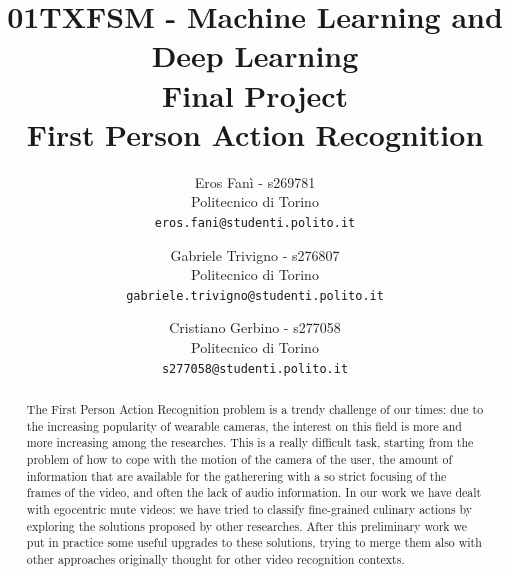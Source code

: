 \documentclass[10pt,twocolumn,hidelinks,letterpaper]{article}
\begin{document}
\title{01TXFSM - Machine Learning and Deep Learning \\
\vspace{0.3in}
Final Project \\
First Person Action Recognition}

\author{
  Eros Fanì - s269781\\
  Politecnico di Torino\\
  {\tt\small eros.fani@studenti.polito.it}
  \and
  Gabriele Trivigno - s276807\\
  Politecnico di Torino\\
  {\tt\small gabriele.trivigno@studenti.polito.it}
  \and
  Cristiano Gerbino - s277058\\
  Politecnico di Torino\\
  {\tt\small s277058@studenti.polito.it}
}

\maketitle


\newcommand{\quotes}[1]{“#1”}
\newcommand{\reff}[1]{Figure \ref{#1}}
\setlength{\parindent}{0pt}
\setlength{\parskip}{1em}

\begin{abstract}

The First Person Action Recognition problem is a trendy challenge of our times: due to the increasing popularity of wearable cameras, the interest on this field is more and more increasing among the researches. This is a really difficult task, starting from the problem of how to cope with the motion of the camera of the user, the amount of information that are available for the gatherering with a so strict focusing of the frames of the video, and often the lack of audio information. In our work we have dealt with egocentric mute videos: we have tried to classify fine-grained culinary actions by exploring the solutions proposed by other researches. After this preliminary work we put in practice some useful upgrades to these solutions, trying to merge them also with other approaches originally thought for other video recognition contexts.

\end{abstract}
\end{document}
